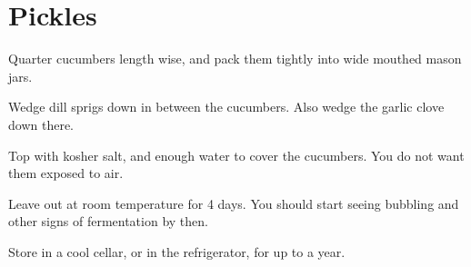 \section{Pickles}

\begin{recipe}



Quarter cucumbers length wise, and pack them tightly into wide mouthed mason jars.

Wedge dill sprigs down in between the cucumbers. Also wedge the garlic clove down there.

Top with kosher salt, and enough water to cover the cucumbers. You do not want them exposed to air.

Leave out at room temperature for 4 days. You should start seeing bubbling and other signs of fermentation by then.

Store in a cool cellar, or in the refrigerator, for up to a year.


\end{recipe}
